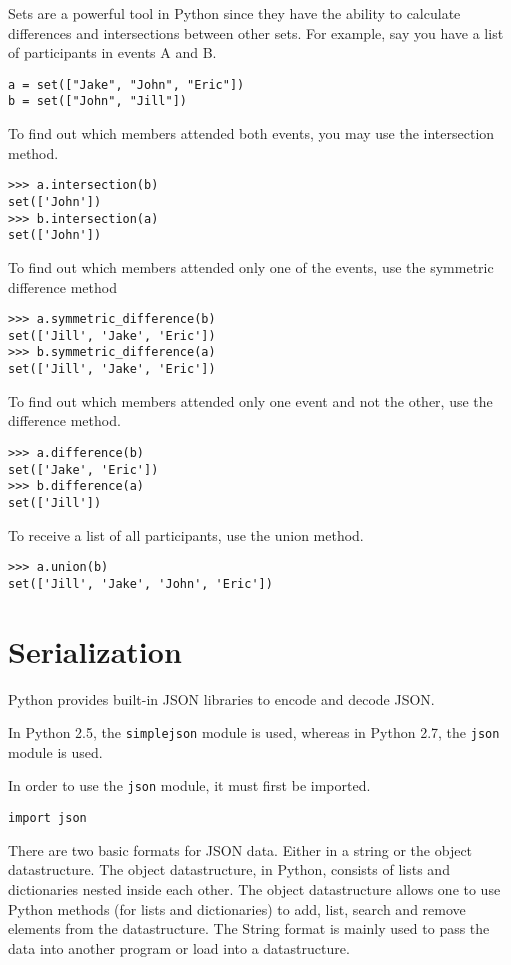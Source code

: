 \documentclass[a4paper,oneside]{book}
\numberwithin{equation}{chapter}
\begin{document}
Sets are a powerful tool in Python since they have the ability to calculate differences and intersections between other sets. For example, say you have a list of participants in events A and B.
\begin{verbatim}
a = set(["Jake", "John", "Eric"])
b = set(["John", "Jill"])
\end{verbatim}

To find out which members attended both events, you may use the intersection method.
\begin{verbatim}
>>> a.intersection(b)
set(['John'])
>>> b.intersection(a)
set(['John'])
\end{verbatim}

To find out which members attended only one of the events, use the symmetric difference method
\begin{verbatim}
>>> a.symmetric_difference(b)
set(['Jill', 'Jake', 'Eric'])
>>> b.symmetric_difference(a)
set(['Jill', 'Jake', 'Eric'])
\end{verbatim}

To find out which members attended only one event and not the other, use the difference method.
\begin{verbatim}
>>> a.difference(b)
set(['Jake', 'Eric'])
>>> b.difference(a)
set(['Jill'])
\end{verbatim}

To receive a list of all participants, use the union method.
\begin{verbatim}
>>> a.union(b)
set(['Jill', 'Jake', 'John', 'Eric'])
\end{verbatim}
\section{Serialization}
Python provides built-in JSON libraries to encode and decode JSON.

In Python 2.5, the \texttt{simplejson} module is used, whereas in Python 2.7, the \texttt{json} module is used.

In order to use the \texttt{json} module, it must first be imported.
\begin{verbatim}
import json
\end{verbatim}

There are two basic formats for JSON data. Either in a string or the object datastructure. The object datastructure, in Python, consists of lists and dictionaries nested inside each other. The object datastructure allows one to use Python methods (for lists and dictionaries) to add, list, search and remove elements from the datastructure. The String format is mainly used to pass the data into another program or load into a datastructure.
\end{document}
